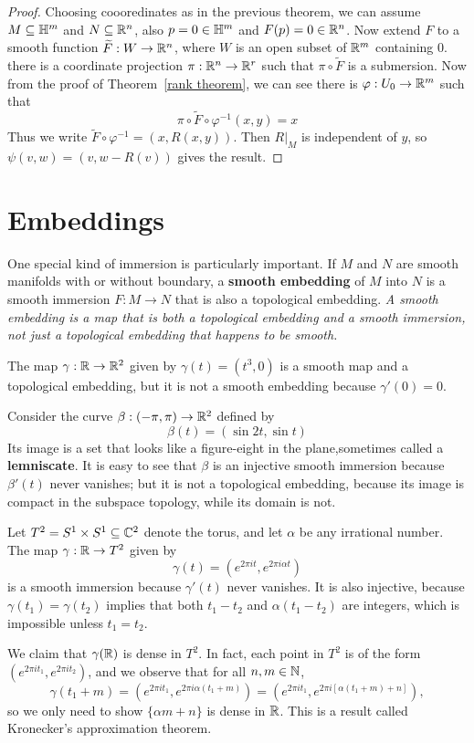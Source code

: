 \begin{proof}
Choosing coooredinates as in the previous theorem, we can assume $M\subseteq\mathbb{H}^m$ and $N\subseteq\mathbb{R}^n$, also $p=0\in\mathbb{H}^m$ and $F(p)=0\in\mathbb{R}^n$. Now extend $F$ to a smooth function $\widetilde{F}:W\to\mathbb{R}^n$, where $W$ is an open subset of $\mathbb{R}^m$ containing $0$. there is a coordinate projection $\pi:\mathbb{R}^n\to\mathbb{R}^r$ such that $\pi\circ\widetilde{F}$ is a submersion. Now from the proof of Theorem~\ref{rank theorem}, we can see there is $\varphi:U_0\to\mathbb{R}^m$ such that
\[\pi\circ\widetilde{F}\circ\varphi^{-1}(x,y)=x\]
Thus we write $\widetilde{F}\circ\varphi^{-1}=(x,R(x,y))$. Then $R|_M$ is independent of $y$, so $\psi(v,w)=(v,w-R(v))$ gives the result.
\end{proof}
\section{Embeddings}
One special kind of immersion is particularly important. If $M$ and $N$ are smooth
manifolds with or without boundary, a \textbf{smooth embedding} of $M$ into $N$ is a smooth immersion $F:M\to N$ that is also a topological embedding. \textit{A smooth embedding is a map that is both a topological embedding and a smooth immersion, not just a topological embedding that happens to be smooth.}
\begin{example}
The map $\gamma:\mathbb{R}\to\mathbb{R}^2$ given by $\gamma(t)=(t^3,0)$ is a smooth map and a topological embedding, but it is not a smooth embedding because $\gamma'(0)=0$.
\end{example}
\begin{example}\label{figure eight}
Consider the curve $\beta:(-\pi,\pi)\to\mathbb{R}^2$ defined by
\[\beta(t)=(\sin 2t,\sin t)\]
Its image is a set that looks like a figure-eight in the plane,sometimes
called a \textbf{lemniscate}. It is easy to see that $\beta$ is an injective smooth immersion because $\beta'(t)$ never vanishes; but it is not a topological embedding, because its image is compact in the subspace topology, while its domain is not.
\end{example}
\begin{example}\label{dense curve torus}
Let $T^2=S^1\times S^1\subseteq\mathbb{C}^2$ denote the torus, and let $\alpha$ be any irrational number. The map $\gamma:\mathbb{R}\to T^2$ given by
\[\gamma(t)=(e^{2\pi it},e^{2\pi i\alpha t})\]
is a smooth immersion because $\gamma'(t)$ never vanishes. It is also injective, because $\gamma(t_1)=\gamma(t_2)$ implies that both $t_1-t_2$ and $\alpha(t_1-t_2)$ are integers, which is impossible unless $t_1=t_2$.\par
We claim that $\gamma(\mathbb{R})$ is dense in $T^2$. In fact, each point in $T^2$ is of the form $(e^{2\pi it_1},e^{2\pi it_2})$, and we observe that for all $n,m\in\mathbb{N}$,
\[\gamma(t_1+m)=(e^{2\pi it_1},e^{2\pi i\alpha(t_1+m)})=(e^{2\pi it_1},e^{2\pi i[\alpha(t_1+m)+n]}),\]
so we only need to show $\{\alpha m+n\}$ is dense in $\mathbb{R}$. This is a result called Kronecker's approximation theorem.
\end{example}
